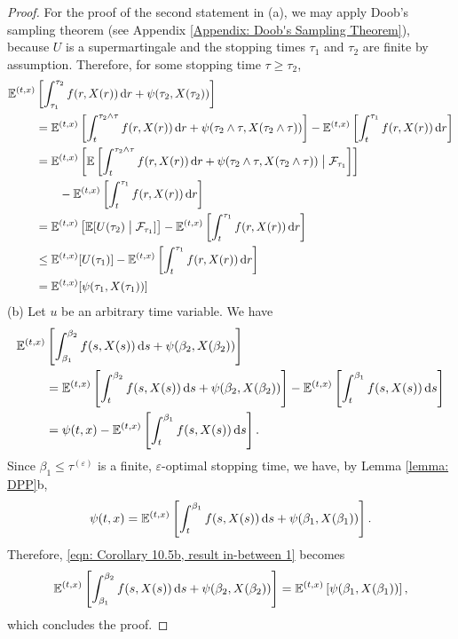 \begin{proof}
    For the proof of the second statement in (a), we may apply Doob's sampling theorem (see Appendix \ref{Appendix: Doob's Sampling Theorem}), because $U$ is a supermartingale and the stopping times $\tau_1$ and $\tau_2$ are finite by assumption. Therefore, for some stopping time $\tau \geq \tau_2$,
    \begin{align*}
        \mathbb{E}^{(t,x)} &\left[ \int_{\tau_1}^{\tau_2} f(r,X(r)) \,\mathrm{d} r + \psi(\tau_2, X(\tau_2)) \right] \\
        &= \mathbb{E}^{(t,x)} \left[ \int_{t}^{\tau_2 \wedge \tau} f(r,X(r)) \,\mathrm{d} r + \psi(\tau_2 \wedge \tau, X(\tau_2 \wedge \tau)) \right] - \mathbb{E}^{(t,x)} \left[\int_{t}^{\tau_1} f(r,X(r)) \,\mathrm{d} r \right] \\
        &= \mathbb{E}^{(t,x)} \left[ \mathbb{E} \left[\int_{t}^{\tau_2 \wedge \tau} f(r,X(r)) \,\mathrm{d} r + \psi(\tau_2 \wedge \tau, X(\tau_2 \wedge \tau)) \bigm| \mathcal{F}_{\tau_1} \right] \right] \\
        & \qquad - \mathbb{E}^{(t,x)} \left[\int_{t}^{\tau_1} f(r,X(r)) \,\mathrm{d} r \right] \\
        &= \mathbb{E}^{(t,x)} \left[ \mathbb{E}[ U(\tau_2) \bigm| \mathcal{F}_{\tau_1}] \right] - \mathbb{E}^{(t,x)} \left[\int_{t}^{\tau_1} f(r,X(r)) \,\mathrm{d} r \right] \\
        & \leq \mathbb{E}^{(t,x)} [U(\tau_1)] - \mathbb{E}^{(t,x)} \left[\int_{t}^{\tau_1} f(r,X(r)) \,\mathrm{d} r \right] \\
        &= \mathbb{E}^{(t,x)} [\psi(\tau_1, X(\tau_1))]
    \end{align*}
    (b) Let $u$ be an arbitrary time variable. We have 
    \begin{align}
        \mathbb{E}^{(t,x)} &\left[ \int_{\beta_1}^{\beta_2} f(s,X(s)) \,\mathrm{d} s + \psi(\beta_2, X(\beta_2)) \right] \nonumber \\
        &= \mathbb{E}^{(t,x)} \left[ \int_{t}^{\beta_2} f(s,X(s)) \,\mathrm{d} s + \psi(\beta_2, X(\beta_2)) \right] - \mathbb{E}^{(t,x)} \left[ \int_{t}^{\beta_1} f(s,X(s)) \,\mathrm{d} s \right] \nonumber \\
        &= \psi(t,x) - \mathbb{E}^{(t,x)} \left[ \int_{t}^{\beta_1} f(s,X(s)) \,\mathrm{d} s \right].
        \label{eqn: Corollary 10.5b, result in-between 1}
    \end{align}
    Since $\beta_1 \leq \tau^{(\varepsilon)}$ is a finite, $\varepsilon$-optimal stopping time, we have, by Lemma \ref{lemma: DPP}b, 
    \begin{equation*}
        \psi(t,x) = \mathbb{E}^{(t,x)} \left[ \int_t^{\beta_1} f(s,X(s)) \,\mathrm{d} s  + \psi(\beta_1, X(\beta_1))\right].
    \end{equation*}
    Therefore, \eqref{eqn: Corollary 10.5b, result in-between 1} becomes
    \begin{align*}
        \mathbb{E}^{(t,x)} \left[ \int_{\beta_1}^{\beta_2} f(s,X(s)) \,\mathrm{d} s + \psi(\beta_2, X(\beta_2)) \right] = \mathbb{E}^{(t,x)} \left[\psi(\beta_1, X(\beta_1))\right],
    \end{align*}
    which concludes the proof.
\end{proof}

